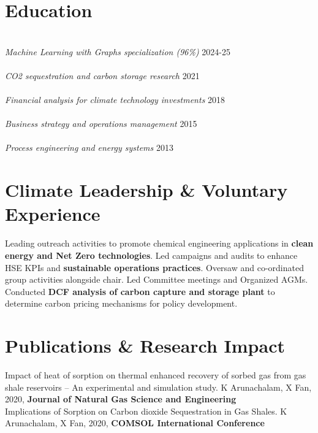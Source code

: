 \documentclass{../../templates/karthicv-single}
\begin{document}
\section{Education}
\\
\textit{Machine Learning with Graphs specialization (96\%)} \hfill 2024-25\\
\\
\textit{CO2 sequestration and carbon storage research} \hfill 2021\\
\\
\textit{Financial analysis for climate technology investments} \hfill 2018\\
\\
\textit{Business strategy and operations management} \hfill 2015\\
\\
\textit{Process engineering and energy systems} \hfill 2013\\

\section{Climate Leadership \& Voluntary Experience}

{Leading outreach activities to promote chemical engineering applications in \textbf{clean energy and Net Zero technologies}.}
{Led campaigns and audits to enhance HSE KPIs and \textbf{sustainable operations practices}.}
{Oversaw and co-ordinated group activities alongside chair. Led Committee meetings and Organized AGMs.}
{Conducted \textbf{DCF analysis of carbon capture and storage plant} to determine carbon pricing mechanisms for policy development.}

\section{Publications \& Research Impact}
Impact of heat of sorption on thermal enhanced recovery of sorbed gas from gas shale reservoirs – An experimental and simulation study. K Arunachalam, X Fan, 2020, \textbf{Journal of Natural Gas Science and Engineering} \\
Implications of Sorption on Carbon dioxide Sequestration in Gas Shales. K Arunachalam, X Fan, 2020, \textbf{COMSOL International Conference}
\end{document}
